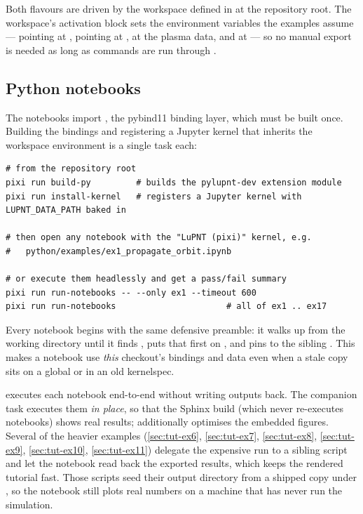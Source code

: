 Both flavours are driven by the  workspace defined in
 at the repository root. The workspace's activation block sets
the environment variables the examples assume --- 
pointing at ,  pointing at
,  at the plasma data, and
 at  --- so no manual export is needed
as long as commands are run through .

\subsection{Python notebooks}
\label{sec:tut-running-python}

The notebooks import \pylupnt{}, the pybind11 binding layer, which must be built
once. Building the bindings and registering a Jupyter kernel that inherits the
workspace environment is a single task each:

\begin{lstlisting}[language=shell, caption={Building and running the Python examples.}, label={lst:tut-run-python}]
# from the repository root
pixi run build-py         # builds the pylupnt-dev extension module
pixi run install-kernel   # registers a Jupyter kernel with LUPNT_DATA_PATH baked in

# then open any notebook with the "LuPNT (pixi)" kernel, e.g.
#   python/examples/ex1_propagate_orbit.ipynb

# or execute them headlessly and get a pass/fail summary
pixi run run-notebooks -- --only ex1 --timeout 600
pixi run run-notebooks                      # all of ex1 .. ex17
\end{lstlisting}

Every notebook begins with the same defensive preamble: it walks up from the
working directory until it finds , puts that
 first on , and pins  to the
sibling . This makes a notebook use \emph{this} checkout's
bindings and data even when a stale copy sits on a global  or
in an old kernelspec.

 executes each notebook end-to-end without writing outputs
back. The companion task  executes them \emph{in place},
so that the Sphinx build (which never re-executes notebooks) shows real results;
 additionally optimises the embedded figures. Several of
the heavier examples (\cref{sec:tut-ex6}, \cref{sec:tut-ex7},
\cref{sec:tut-ex8}, \cref{sec:tut-ex9}, \cref{sec:tut-ex10},
\cref{sec:tut-ex11}) delegate the expensive run to a sibling
 script and let the notebook read back the exported results,
which keeps the rendered tutorial fast. Those scripts seed their output
directory from a shipped copy under , so the
notebook still plots real numbers on a machine that has never run the
simulation.

